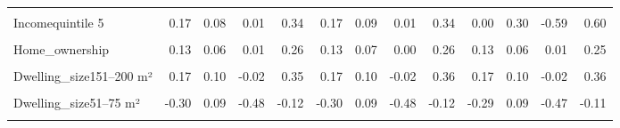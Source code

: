 \begin{table}
\begin{tabular}[t]{lrrrrrrrrrrrr}
\cellcolor{gray!10}{Incomequintile 4} & \cellcolor{gray!10}{0.17} & \cellcolor{gray!10}{0.09} & \cellcolor{gray!10}{0.00} & \cellcolor{gray!10}{0.33} & \cellcolor{gray!10}{0.17} & \cellcolor{gray!10}{0.09} & \cellcolor{gray!10}{0.00} & \cellcolor{gray!10}{0.34} & \cellcolor{gray!10}{0.51} & \cellcolor{gray!10}{0.31} & \cellcolor{gray!10}{-0.10} & \cellcolor{gray!10}{1.14}\\
Incomequintile 5 & 0.17 & 0.08 & 0.01 & 0.34 & 0.17 & 0.09 & 0.01 & 0.34 & 0.00 & 0.30 & -0.59 & 0.60\\
\cellcolor{gray!10}{Higher\_edu} & \cellcolor{gray!10}{0.02} & \cellcolor{gray!10}{0.06} & \cellcolor{gray!10}{-0.08} & \cellcolor{gray!10}{0.13} & \cellcolor{gray!10}{0.03} & \cellcolor{gray!10}{0.06} & \cellcolor{gray!10}{-0.09} & \cellcolor{gray!10}{0.14} & \cellcolor{gray!10}{0.02} & \cellcolor{gray!10}{0.05} & \cellcolor{gray!10}{-0.08} & \cellcolor{gray!10}{0.13}\\
Home\_ownership & 0.13 & 0.06 & 0.01 & 0.26 & 0.13 & 0.07 & 0.00 & 0.26 & 0.13 & 0.06 & 0.01 & 0.25\\
\cellcolor{gray!10}{Dwelling\_house} & \cellcolor{gray!10}{0.10} & \cellcolor{gray!10}{0.06} & \cellcolor{gray!10}{-0.02} & \cellcolor{gray!10}{0.22} & \cellcolor{gray!10}{0.11} & \cellcolor{gray!10}{0.07} & \cellcolor{gray!10}{-0.02} & \cellcolor{gray!10}{0.23} & \cellcolor{gray!10}{0.11} & \cellcolor{gray!10}{0.06} & \cellcolor{gray!10}{-0.02} & \cellcolor{gray!10}{0.23}\\
Dwelling\_size151–200 m² & 0.17 & 0.10 & -0.02 & 0.35 & 0.17 & 0.10 & -0.02 & 0.36 & 0.17 & 0.10 & -0.02 & 0.36\\
\cellcolor{gray!10}{Dwelling\_size26–50 m²} & \cellcolor{gray!10}{-0.18} & \cellcolor{gray!10}{0.11} & \cellcolor{gray!10}{-0.39} & \cellcolor{gray!10}{0.04} & \cellcolor{gray!10}{-0.18} & \cellcolor{gray!10}{0.12} & \cellcolor{gray!10}{-0.40} & \cellcolor{gray!10}{0.04} & \cellcolor{gray!10}{-0.17} & \cellcolor{gray!10}{0.11} & \cellcolor{gray!10}{-0.39} & \cellcolor{gray!10}{0.05}\\
Dwelling\_size51–75 m² & -0.30 & 0.09 & -0.48 & -0.12 & -0.30 & 0.09 & -0.48 & -0.12 & -0.29 & 0.09 & -0.47 & -0.11\\
\cellcolor{gray!10}{Dwelling\_size76–100 m²} & \cellcolor{gray!10}{-0.12} & \cellcolor{gray!10}{0.08} & \cellcolor{gray!10}{-0.28} & \cellcolor{gray!10}{0.03} & \cellcolor{gray!10}{-0.12} & \cellcolor{gray!10}{0.08} & \cellcolor{gray!10}{-0.28} & \cellcolor{gray!10}{0.03} & \cellcolor{gray!10}{-0.12} & \cellcolor{gray!10}{0.08} & \cellcolor{gray!10}{-0.27} & \cellcolor{gray!10}{0.03}\\

\end{tabular}
\end{table}
